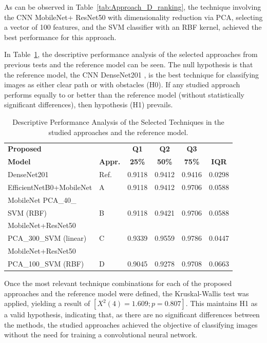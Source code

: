 \documentclass[preprint,12pt]{elsarticle}
\begin{document}
As can be observed in Table~\ref{tab:Approach_D_ranking}, the technique involving the CNN MobileNet+ ResNet50 with dimensionality reduction via PCA, selecting a vector of 100 features, and the SVM classifier with an RBF kernel, achieved the best performance for this approach.

In Table~\ref{tab:Approaches_Comparative}, the descriptive performance analysis of the selected approaches from previous tests and the reference model can be seen. The null hypothesis is that the reference model, the CNN DenseNet201 \cite{huang2017}, is the best technique for classifying images as either clear path or with obstacles (H0). If any studied approach performs equally to or better than the reference model (without statistically significant differences), then hypothesis (H1) prevails.

\begin{table}[h!]
	\caption{Descriptive Performance Analysis of the Selected Techniques in the studied approaches and the reference model.}
	\label{tab:Approaches_Comparative}
	\centering
	\begin{tabular}{|l|l|c|c|c|c|}
		\hline
		\textbf{Proposed} & \textbf{} & \textbf{Q1} & \textbf{Q2} & \textbf{Q3} & \textbf{} \\
		\textbf{Model} & \textbf{Appr.} & \textbf{25\%} & \textbf{50\%} & \textbf{75\%} & \textbf{IQR} \\
		\hline
		DenseNet201 & Ref. & 0.9118 & 0.9412 & 0.9416 & 0.0298 \\
		EfficientNetB0+MobileNet & A & 0.9118 & 0.9412 & 0.9706 & 0.0588 \\
		MobileNet PCA\_40\_ &  &  &  &  &  \\
		SVM (RBF) & B & 0.9118 & 0.9421 & 0.9706 & 0.0588 \\
		MobileNet+ResNet50 &  &  &  &  &  \\
		PCA\_300\_SVM (linear) & C & 0.9339 & 0.9559 & 0.9786 & 0.0447 \\
		MobileNet+ResNet50 &  &  &  &  &  \\
		PCA\_100\_SVM (RBF) & D & 0.9045 & 0.9278 & 0.9708 & 0.0663 \\
		\hline
	\end{tabular}
\end{table}

Once the most relevant technique combinations for each of the proposed approaches and the reference model were defined, the Kruskal-Wallis test was applied, yielding a result of $[X^2(4)=1.609; p=0.807]$. This maintains H1 as a valid hypothesis, indicating that, as there are no significant differences between the methods, the studied approaches achieved the objective of classifying images without the need for training a convolutional neural network.
\end{document}

